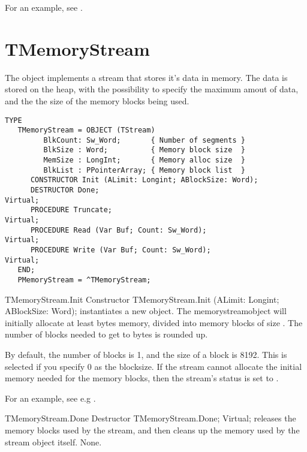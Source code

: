 For an example, see .

\section{TMemoryStream}
\label{se:TMemoryStream}

The  object implements a stream that stores it's data
in memory. The data is stored on the heap, with the possibility to specify
the maximum amout of data, and the the size of the memory blocks being used.
 
\begin{verbatim}
TYPE
   TMemoryStream = OBJECT (TStream)
         BlkCount: Sw_Word;       { Number of segments }
         BlkSize : Word;          { Memory block size  }
         MemSize : LongInt;       { Memory alloc size  }
         BlkList : PPointerArray; { Memory block list  }
      CONSTRUCTOR Init (ALimit: Longint; ABlockSize: Word);
      DESTRUCTOR Done;                                               Virtual;
      PROCEDURE Truncate;                                            Virtual;
      PROCEDURE Read (Var Buf; Count: Sw_Word);                      Virtual;
      PROCEDURE Write (Var Buf; Count: Sw_Word);                     Virtual;
   END;
   PMemoryStream = ^TMemoryStream;
\end{verbatim}

\begin{procedure}{TMemoryStream.Init}
\Declaration
Constructor TMemoryStream.Init (ALimit: Longint; ABlockSize: Word);
\Description
{} instantiates a new  object. The
memorystreamobject will initially allocate at least  bytes memory, 
divided into memory blocks of size . 
The number of blocks needed to get to  bytes is rounded up.

By default, the number of blocks is 1, and the size of a block is 8192. This
is selected if you specify 0 as the blocksize.
\Errors
If the stream cannot allocate the initial memory needed for the memory blocks, then
the stream's status is set to .
\SeeAlso
{}
\end{procedure}

For an example, see e.g .

\begin{procedure}{TMemoryStream.Done}
\Declaration
Destructor TMemoryStream.Done; Virtual;
\Description
{} releases the memory blocks used by the stream, and then cleans up
the memory used by the stream object itself.
\Errors
None.
\SeeAlso
{}
\end{procedure}

